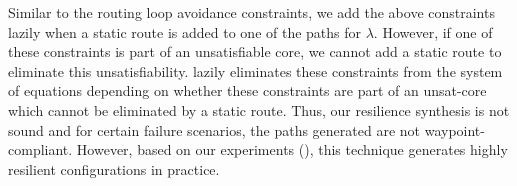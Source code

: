 Similar to the routing loop avoidance constraints, we add the
above constraints lazily when a static route is added to one of the
paths for $\lambda$. However, if one of these constraints is part of 
an unsatisfiable core, we cannot add a static route to eliminate 
this unsatisfiability. \name lazily eliminates these constraints from the
system of equations depending on whether these constraints are part of 
an unsat-core which cannot be eliminated by a static route. Thus, 
our resilience synthesis is not sound and for certain failure scenarios, 
the paths generated are not waypoint-compliant. However, 
based on our experiments (), 
this technique generates highly resilient configurations 
in practice. 

